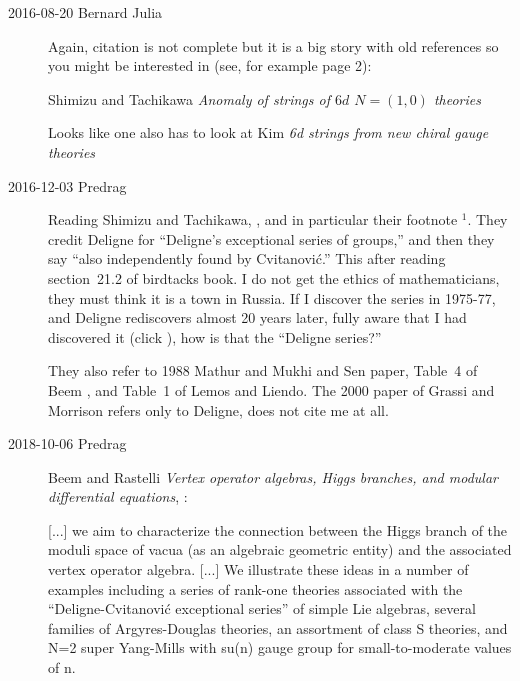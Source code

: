 \begin{description}
\item[2016-08-20 Bernard Julia]
Again, citation is not complete but it is a big story with old references
so you might be interested in (see, for example page 2):

Shimizu and Tachikawa
{\em Anomaly of strings of {$6d$ $N = (1,0)$} theories}

Looks like one also has to look at
Kim \etal{} {\em {6d} strings from new chiral gauge theories}

\item[2016-12-03 Predrag]
Reading Shimizu and Tachikawa, ,
and in particular their footnote $^1$.
They credit Deligne for ``Deligne's exceptional series of groups,'' and then
they say ``also independently found by Cvitanovi{\'c}.'' This after reading
section~21.2 of birdtacks book. I do not get the ethics of
mathematicians, they must think it is a town in Russia. If I discover the
series in 1975-77, and Deligne rediscovers almost 20 years
later, fully aware that I had discovered it (click
), how is that the
``Deligne series?''

They also refer to {1988} Mathur and Mukhi and Sen paper,
Table~4 of Beem \etal{}, and Table~1 of Lemos and
Liendo. The 2000 paper of Grassi and Morrison
refers only to Deligne, does not cite me at all.

\item[2018-10-06 Predrag]
Beem and Rastelli
{\em Vertex operator algebras, {Higgs} branches, and modular differential equations},
:

[...] we aim to characterize the connection between the Higgs branch of the
moduli space of vacua (as an algebraic geometric entity) and the associated
vertex operator algebra.
[...] We illustrate these ideas in a number of examples including a series of
rank-one theories associated with the ``Deligne-Cvitanovi{\'c} exceptional series''
of simple Lie algebras, several families of Argyres-Douglas theories, an
assortment of class S theories, and N=2 super Yang-Mills with su(n) gauge group
for small-to-moderate values of n.


\end{description}
